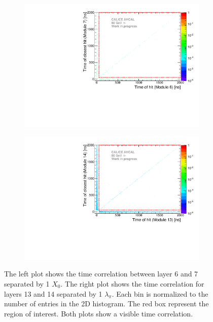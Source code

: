 \begin{figure}[htbp!]
	\begin{subfigure}[t]{0.5\textwidth}
		\centering
		\includegraphics[width=1\textwidth]{../Thesis_Plots/Timing/Pions/Plots/Time_Correlation_short.pdf}
		\caption{} \label{fig:Time_Corr_short}
	\end{subfigure}
	\hfill
	\begin{subfigure}[t]{0.5\textwidth}
		\centering
		\includegraphics[width=1\textwidth]{../Thesis_Plots/Timing/Pions/Plots/Time_Correlation_long.pdf}
		\caption{}\label{fig:Time_Corr_long}
	\end{subfigure}
	\caption{The left plot shows the time correlation between layer 6 and 7 separated by 1 $X_0$. The right plot shows the time correlation for layers 13 and 14 separated by 1 $\lambda_{\pi}$. Each bin is normalized to the number of entries in the 2D histogram. The red box represent the region of interest. Both plots show a visible time correlation.}
	\label{fig:TimeCorrelation}
\end{figure}

